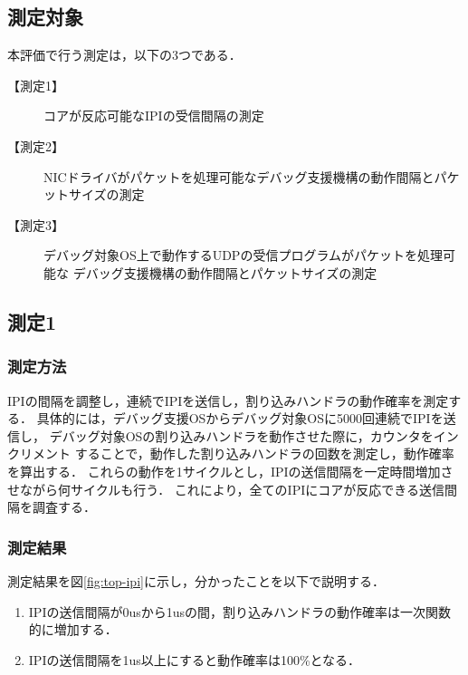 \documentclass[submit,techreq,noauthor,dvipdfmx]{ipsj}
\begin{document}
\subsection{測定対象}

本評価で行う測定は，以下の3つである．

\begin{description}
    \item[【測定1】]
        コアが反応可能なIPIの受信間隔の測定
    \item[【測定2】]
        NICドライバがパケットを処理可能なデバッグ支援機構の動作間隔とパケットサイズの測定
    \item[【測定3】]
        デバッグ対象OS上で動作するUDPの受信プログラムがパケットを処理可能な
        デバッグ支援機構の動作間隔とパケットサイズの測定
\end{description}

\subsection{測定1}

\subsubsection{測定方法}

IPIの間隔を調整し，連続でIPIを送信し，割り込みハンドラの動作確率を測定する．
具体的には，デバッグ支援OSからデバッグ対象OSに5000回連続でIPIを送信し，
デバッグ対象OSの割り込みハンドラを動作させた際に，カウンタをインクリメント
することで，動作した割り込みハンドラの回数を測定し，動作確率を算出する．
これらの動作を1サイクルとし，IPIの送信間隔を一定時間増加させながら何サイクルも行う．
これにより，全てのIPIにコアが反応できる送信間隔を調査する．

\subsubsection{測定結果}\label{result-ipi-limit}
測定結果を図\ref{fig:top-ipi}に示し，分かったことを以下で説明する．

\begin{enumerate}
    \item IPIの送信間隔が0usから1usの間，割り込みハンドラの動作確率は一次関数
        的に増加する．
    \item IPIの送信間隔を1us以上にすると動作確率は100\%となる．
\end{enumerate}
\end{document}
